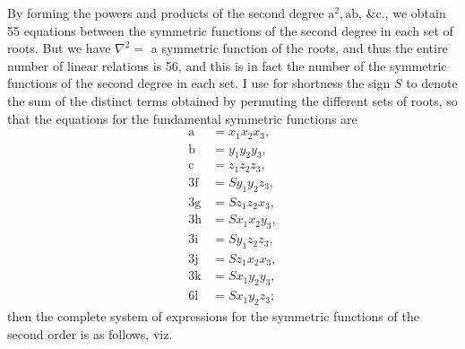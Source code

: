 \documentclass[11pt]{article}
\begin{document}
\noindent By forming the powers and products of the second degree $\mathrm{a}^2, \mathrm{ab}$, \&c., we obtain 55 equations between the symmetric functions of the second degree in each set of roots. But we have $\nabla^2 = $ a symmetric function of the roots, and thus the entire number of linear relations is 56, and this is in fact the number of the symmetric functions of the second degree in each set. I use for shortness the sign $S$ to denote the sum of the distinct terms obtained by permuting the different sets of roots, so that the equations for the fundamental symmetric functions are
\[
\begin{aligned}
\mathrm{a} &= x_1 x_2 x_3,\\
\mathrm{b} &= y_1 y_2 y_3,\\
\mathrm{c} &= z_1 z_2 z_3,\\
3\mathrm{f} &= S y_1 y_2 z_3,\\
3\mathrm{g} &= S z_1 z_2 x_3,\\
3\mathrm{h} &= S x_1 x_2 y_3,\\
3\mathrm{i} &= S y_1 z_2 z_3,\\
3\mathrm{j} &= S z_1 x_2 x_3,\\
3\mathrm{k} &= S x_1 y_2 y_3,\\
6\mathrm{l} &= S x_1 y_2 z_3;
\end{aligned}
\]
then the complete system of expressions for the symmetric functions of the second order is as follows, viz.
\end{document}
